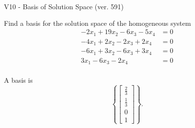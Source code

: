 \begin{exercise}
  \begin{exerciseTitle}V10 - Basis of Solution Space (ver. 591)\end{exerciseTitle}
  \begin{exerciseStatement}
    Find a basis for the solution space of the homogeneous system 
\begin{align*}
 -2 x_ 1 + 19 x_ 2 -6 x_ 3 -5 x_ 4 &= 0  \\ 
  -4 x_ 1 + 2 x_ 2 -2 x_ 3 + 2 x_ 4 &= 0  \\ 
  -6 x_ 1 + 3 x_ 2 -6 x_ 3 + 3 x_ 4 &= 0  \\ 
  3 x_ 1 -6 x_ 3 -2 x_ 4 &= 0  \\ 
 \end{align*}


 
  \end{exerciseStatement}

  \begin{exerciseAnswer}
   A basis is   
\[\left\{\left[\begin{array}{c}
\frac{2}{3} \\
\frac{1}{3} \\
0 \\
1
\end{array}\right]\right\}.\]

  


  \end{exerciseAnswer}
\end{exercise}